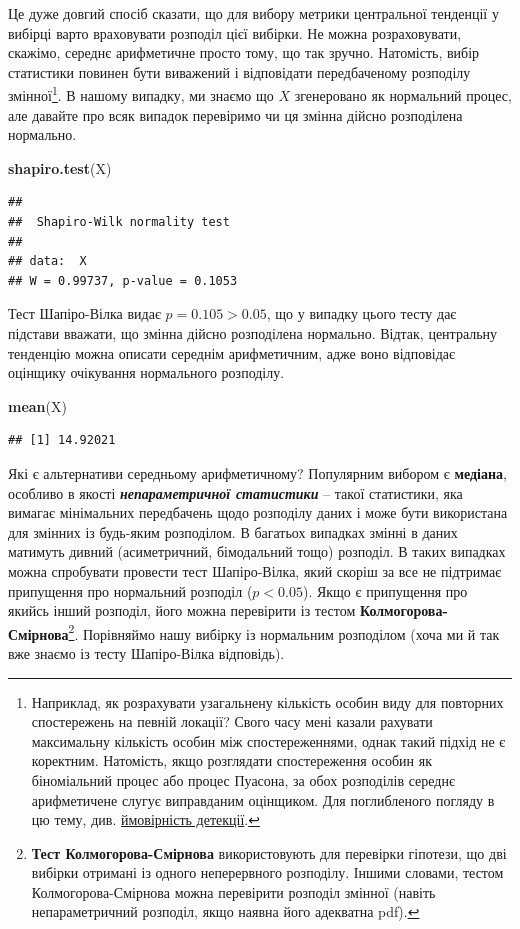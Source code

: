 \documentclass[
  11pt,
]{book}
\newenvironment{Shaded}{\begin{snugshade}}{\end{snugshade}}
\newcommand{\FunctionTok}[1]{\textcolor[rgb]{0.13,0.29,0.53}{\textbf{#1}}}
\newcommand{\NormalTok}[1]{#1}
\begin{document}
Це дуже довгий спосіб сказати, що для вибору метрики центральної тенденції у вибірці варто враховувати розподіл цієї вибірки. Не можна розраховувати, скажімо, середнє арифметичне просто тому, що так зручно. Натомість, вибір статистики повинен бути виважений і відповідати передбаченому розподілу змінної\footnote{Наприклад, як розрахувати узагальнену кількість особин виду для повторних спостережень на певній локації? Свого часу мені казали рахувати максимальну кількість особин між спостереженнями, однак такий підхід не є коректним. Натомість, якщо розглядати спостереження особин як біноміальний процес або процес Пуасона, за обох розподілів середнє арифметичене слугує виправданим оцінщиком. Для поглибленого погляду в цю тему, див. \hyperref[detectability]{ймовірність детекції}.}. В нашому випадку, ми знаємо що \(X\) згенеровано як нормальний процес, але давайте про всяк випадок перевіримо чи ця змінна дійсно розподілена нормально.

\begin{Shaded}
\begin{Highlighting}[]
\FunctionTok{shapiro.test}\NormalTok{(X)}
\end{Highlighting}
\end{Shaded}

\begin{verbatim}
## 
##  Shapiro-Wilk normality test
## 
## data:  X
## W = 0.99737, p-value = 0.1053
\end{verbatim}

Тест Шапіро-Вілка видає \(p = 0.105 > 0.05\), що у випадку цього тесту дає підстави вважати, що змінна дійсно розподілена нормально. Відтак, центральну тенденцію можна описати середнім арифметичним, адже воно відповідає оцінщику очікування нормального розподілу.

\begin{Shaded}
\begin{Highlighting}[]
\FunctionTok{mean}\NormalTok{(X)}
\end{Highlighting}
\end{Shaded}

\begin{verbatim}
## [1] 14.92021
\end{verbatim}

Які є альтернативи середньому арифметичному? Популярним вибором є \textbf{медіана}, особливо в якості \textbf{\emph{непараметричної статистики}} -- такої статистики, яка вимагає мінімальних передбачень щодо розподілу даних і може бути використана для змінних із будь-яким розподілом. В багатьох випадках змінні в даних матимуть дивний (асиметричний, бімодальний тощо) розподіл. В таких випадках можна спробувати провести тест Шапіро-Вілка, який скоріш за все не підтримає припущення про нормальний розподіл (\(p < 0.05\)). Якщо є припущення про якийсь інший розподіл, його можна перевірити із тестом \textbf{Колмогорова-Смірнова}\footnote{\textbf{Тест Колмогорова-Смірнова} використовують для перевірки гіпотези, що дві вибірки отримані із одного неперервного розподілу. Іншими словами, тестом Колмогорова-Смірнова можна перевірити розподіл змінної (навіть непараметричний розподіл, якщо наявна його адекватна pdf).}. Порівняймо нашу вибірку із нормальним розподілом (хоча ми й так вже знаємо із тесту Шапіро-Вілка відповідь).
\end{document}
